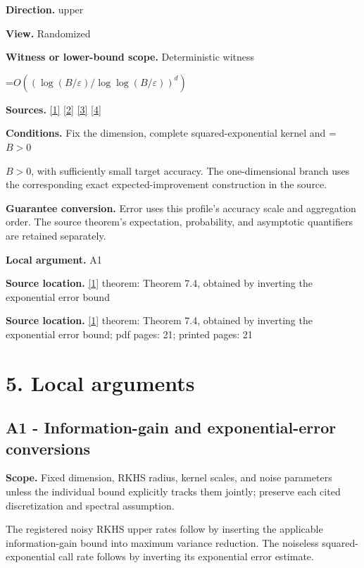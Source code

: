 \documentclass[10pt,a4paper]{article}
\newcommand{\AtlasMath}[1]{\par\begingroup\centering\setbox0=\hbox{$\displaystyle #1$}\ifdim\wd0>1.4\linewidth\typeout{ATLAS WIDE FORMULA: \the\wd0}\fi\ifdim\wd0>\linewidth\resizebox{\linewidth}{!}{\box0}\else\box0\fi\par\endgroup}
\newcommand{\AtlasInlineMath}[1]{\begingroup\setbox0=\hbox{$#1$}\ifdim\wd0>.4\linewidth\endgroup\AtlasMath{#1}\else\endgroup$#1$\fi}
\begin{document}
\textbf{Direction.} upper

\textbf{View.} Randomized

\textbf{Witness or lower-bound scope.} Deterministic witness

\AtlasMath{O\!\left((\log(B/\varepsilon)/\log\log(B/\varepsilon))^d\right)}
\textbf{Sources.} \href{https://arxiv.org/html/2607.29245v2}{[1]} \href{https://proceedings.neurips.cc/paper/2021/file/b1300291698eadedb559786c809cc592-Paper.pdf}{[2]} \href{https://arxiv.org/html/2602.17940v1}{[3]} \href{https://arxiv.org/html/2502.06363v1}{[4]}

\textbf{Conditions.} Fix the dimension, complete squared-exponential kernel and \AtlasInlineMath{B>0}, with sufficiently small target accuracy. The one-dimensional branch uses the corresponding exact expected-improvement construction in the source.

\textbf{Guarantee conversion.} Error uses this profile's accuracy scale and aggregation order. The source theorem's expectation, probability, and asymptotic quantifiers are retained separately.

\textbf{Local argument.} A1

\textbf{Source location.} \href{https://arxiv.org/html/2607.29245v2}{[1]} theorem: Theorem 7.4, obtained by inverting the exponential error bound

\textbf{Source location.} \href{https://arxiv.org/html/2607.29245v2}{[1]} theorem: Theorem 7.4, obtained by inverting the exponential error bound; pdf pages: 21; printed pages: 21

\section{5. Local arguments}
\subsection{A1 - Information-gain and exponential-error conversions}
\textbf{Scope.} Fixed dimension, RKHS radius, kernel scales, and noise parameters unless the individual bound explicitly tracks them jointly; preserve each cited discretization and spectral assumption.

The registered noisy RKHS upper rates follow by inserting the applicable information-gain bound into maximum variance reduction. The noiseless squared-exponential call rate follows by inverting its exponential error estimate.
\end{document}
